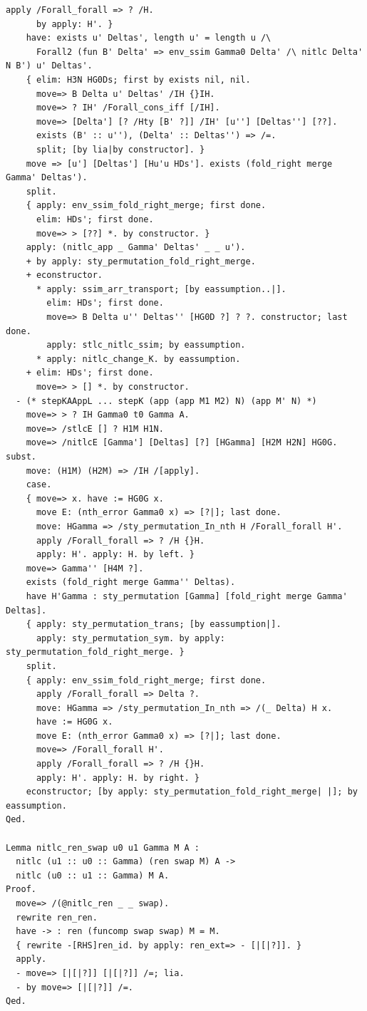 \documentclass[10pt,a4paper]{article}
\begin{document}
\begin{lstlisting}[style=authorcoq]
      apply /Forall_forall => ? /H.
      by apply: H'. }
    have: exists u' Deltas', length u' = length u /\
      Forall2 (fun B' Delta' => env_ssim Gamma0 Delta' /\ nitlc Delta' N B') u' Deltas'.
    { elim: H3N HG0Ds; first by exists nil, nil.
      move=> B Delta u' Deltas' /IH {}IH.
      move=> ? IH' /Forall_cons_iff [/IH].
      move=> [Delta'] [? /Hty [B' ?]] /IH' [u''] [Deltas''] [??].
      exists (B' :: u''), (Delta' :: Deltas'') => /=.
      split; [by lia|by constructor]. }
    move => [u'] [Deltas'] [Hu'u HDs']. exists (fold_right merge Gamma' Deltas').
    split.
    { apply: env_ssim_fold_right_merge; first done.
      elim: HDs'; first done.
      move=> > [??] *. by constructor. }
    apply: (nitlc_app _ Gamma' Deltas' _ _ u').
    + by apply: sty_permutation_fold_right_merge.
    + econstructor.
      * apply: ssim_arr_transport; [by eassumption..|].
        elim: HDs'; first done.
        move=> B Delta u'' Deltas'' [HG0D ?] ? ?. constructor; last done.
        apply: stlc_nitlc_ssim; by eassumption.
      * apply: nitlc_change_K. by eassumption.
    + elim: HDs'; first done.
      move=> > [] *. by constructor.
  - (* stepKAAppL ... stepK (app (app M1 M2) N) (app M' N) *)
    move=> > ? IH Gamma0 t0 Gamma A.
    move=> /stlcE [] ? H1M H1N.
    move=> /nitlcE [Gamma'] [Deltas] [?] [HGamma] [H2M H2N] HG0G. subst.
    move: (H1M) (H2M) => /IH /[apply].
    case.
    { move=> x. have := HG0G x.
      move E: (nth_error Gamma0 x) => [?|]; last done.
      move: HGamma => /sty_permutation_In_nth H /Forall_forall H'.
      apply /Forall_forall => ? /H {}H.
      apply: H'. apply: H. by left. }
    move=> Gamma'' [H4M ?].
    exists (fold_right merge Gamma'' Deltas).
    have H'Gamma : sty_permutation [Gamma] [fold_right merge Gamma' Deltas].
    { apply: sty_permutation_trans; [by eassumption|].
      apply: sty_permutation_sym. by apply: sty_permutation_fold_right_merge. }
    split.
    { apply: env_ssim_fold_right_merge; first done.
      apply /Forall_forall => Delta ?.
      move: HGamma => /sty_permutation_In_nth => /(_ Delta) H x.
      have := HG0G x.
      move E: (nth_error Gamma0 x) => [?|]; last done.
      move=> /Forall_forall H'.
      apply /Forall_forall => ? /H {}H.
      apply: H'. apply: H. by right. }
    econstructor; [by apply: sty_permutation_fold_right_merge| |]; by eassumption.
Qed.

Lemma nitlc_ren_swap u0 u1 Gamma M A :
  nitlc (u1 :: u0 :: Gamma) (ren swap M) A ->
  nitlc (u0 :: u1 :: Gamma) M A.
Proof.
  move=> /(@nitlc_ren _ _ swap).
  rewrite ren_ren.
  have -> : ren (funcomp swap swap) M = M.
  { rewrite -[RHS]ren_id. by apply: ren_ext=> - [|[|?]]. }
  apply.
  - move=> [|[|?]] [|[|?]] /=; lia.
  - by move=> [|[|?]] /=.
Qed.


\end{lstlisting}
\end{document}
